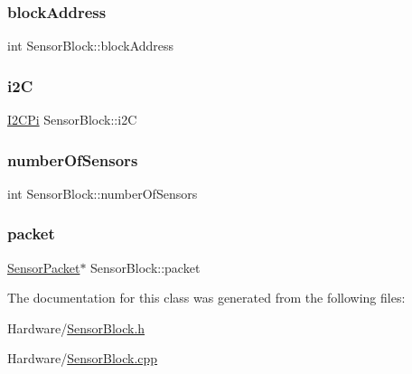 \subsubsection{\texorpdfstring{block\+Address}{blockAddress}}
{\footnotesize\ttfamily int Sensor\+Block\+::block\+Address\hspace{0.3cm}{\ttfamily [private]}}

\mbox{\label{class_sensor_block_ae7627da0b0154d28327756ffa0883281}} 
\subsubsection{\texorpdfstring{i2C}{i2C}}
{\footnotesize\ttfamily \mbox{\hyperlink{class_i2_c_pi}{I2\+C\+Pi}} Sensor\+Block\+::i2C\hspace{0.3cm}{\ttfamily [private]}}

\mbox{\label{class_sensor_block_a323076089f7227ca2d5a50be10538f1b}} 
\subsubsection{\texorpdfstring{number\+Of\+Sensors}{numberOfSensors}}
{\footnotesize\ttfamily int Sensor\+Block\+::number\+Of\+Sensors\hspace{0.3cm}{\ttfamily [private]}}

\mbox{\label{class_sensor_block_a7400a743ef512ca008cd1cebc9a3856e}} 
\subsubsection{\texorpdfstring{packet}{packet}}
{\footnotesize\ttfamily \mbox{\hyperlink{class_sensor_packet}{Sensor\+Packet}}$\ast$ Sensor\+Block\+::packet\hspace{0.3cm}{\ttfamily [private]}}



The documentation for this class was generated from the following files\+:\begin{DoxyCompactItemize}
\item 
Hardware/\mbox{\hyperlink{_sensor_block_8h}{Sensor\+Block.\+h}}\item 
Hardware/\mbox{\hyperlink{_sensor_block_8cpp}{Sensor\+Block.\+cpp}}\end{DoxyCompactItemize}
